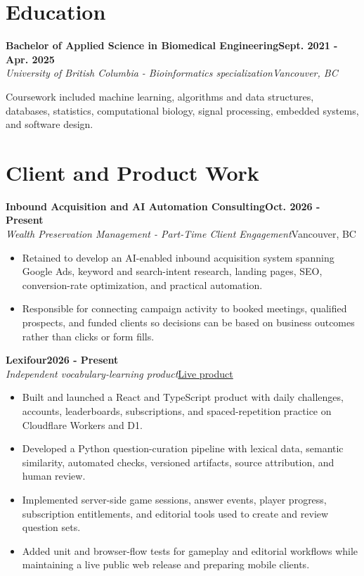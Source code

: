 \documentclass[10pt,letterpaper]{article}
\newenvironment{bullets}{\begin{itemize}[topsep=0.03cm,parsep=0pt,partopsep=0pt,itemsep=0.02cm,leftmargin=11pt]}{\end{itemize}}
\newcommand{\role}[4]{\needspace{3\baselineskip}\textbf{#1}\hfill\textbf{#2}\\[-1pt]\textit{#3}\hfill\textit{#4}\par}
\newcommand{\project}[4]{\needspace{6\baselineskip}\textbf{#1}\hfill\textbf{#2}\\[-1pt]\textit{#3}\hfill #4\par}
\begin{document}
\section{Education}
\role{Bachelor of Applied Science in Biomedical Engineering}{Sept. 2021 - Apr. 2025}{University of British Columbia - Bioinformatics specialization}{Vancouver, BC}
Coursework included machine learning, algorithms and data structures, databases, statistics, computational biology, signal processing, embedded systems, and software design.

\newpage
\section{Client and Product Work}

\project{Inbound Acquisition and AI Automation Consulting}{Oct. 2026 - Present}{Wealth Preservation Management - Part-Time Client Engagement}{Vancouver, BC}
\begin{bullets}
\item Retained to develop an AI-enabled inbound acquisition system spanning Google Ads, keyword and search-intent research, landing pages, SEO, conversion-rate optimization, and practical automation.
\item Responsible for connecting campaign activity to booked meetings, qualified prospects, and funded clients so decisions can be based on business outcomes rather than clicks or form fills.
\end{bullets}

\project{Lexifour}{2026 - Present}{Independent vocabulary-learning product}{\href{https://lexifour.com}{Live product}}
\begin{bullets}
\item Built and launched a React and TypeScript product with daily challenges, accounts, leaderboards, subscriptions, and spaced-repetition practice on Cloudflare Workers and D1.
\item Developed a Python question-curation pipeline with lexical data, semantic similarity, automated checks, versioned artifacts, source attribution, and human review.
\item Implemented server-side game sessions, answer events, player progress, subscription entitlements, and editorial tools used to create and review question sets.
\item Added unit and browser-flow tests for gameplay and editorial workflows while maintaining a live public web release and preparing mobile clients.
\end{bullets}
\end{document}
